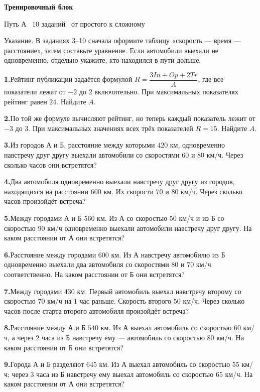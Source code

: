 \documentclass[a4paper,12pt]{article}
\newcommand{\key}[1]{\textcolor{darkaccent}{#1}}
\newcommand{\task}[2]{\par\smallskip\noindent\textbf{#1.}\quad #2\par}
\begin{document}
\clearpage
\begin{center}
{\Large\color{darkaccent}\bfseries Тренировочный блок}\par
{\small Путь А \textbullet\ 10 заданий \textbullet\ от простого к сложному}\par
\end{center}
\vspace{2mm}
\begingroup{}\setlength{\parskip}{1pt}
\noindent\key{Указание.} В заданиях 3--10 сначала оформите таблицу «скорость --- время --- расстояние», затем составьте уравнение. Если автомобили выехали не одновременно, отдельно укажите, кто находился в пути дольше.

\task{1}{Рейтинг публикации задаётся формулой
$R=\dfrac{3In+Op+2Tr}{A}$, где все показатели лежат от $-2$ до $2$ включительно. При максимальных показателях рейтинг равен $24$. Найдите $A$.}

\task{2}{По той же формуле вычисляют рейтинг, но теперь каждый показатель лежит от $-3$ до $3$. При максимальных значениях всех трёх показателей $R=15$. Найдите $A$.}

\task{3}{Из городов А и Б, расстояние между которыми $420$ км, одновременно навстречу друг другу выехали автомобили со скоростями $60$ и $80$ км/ч. Через сколько часов они встретятся?}

\task{4}{Два автомобиля одновременно выехали навстречу друг другу из городов, находящихся на расстоянии $600$ км. Их скорости $70$ и $80$ км/ч. Через сколько часов произойдёт встреча?}

\task{5}{Между городами А и Б $560$ км. Из А со скоростью $50$ км/ч и из Б со скоростью $90$ км/ч одновременно выехали автомобили навстречу друг другу. На каком расстоянии от А они встретятся?}

\task{6}{Расстояние между городами $600$ км. Из А навстречу автомобилю из Б одновременно выехали два автомобиля со скоростями $80$ и $70$ км/ч соответственно. На каком расстоянии от Б они встретятся?}

\task{7}{Между городами $430$ км. Первый автомобиль выехал навстречу второму со скоростью $70$ км/ч на $1$ час раньше. Скорость второго $50$ км/ч. Через сколько часов после старта второго автомобиля произойдёт встреча?}

\task{8}{Расстояние между А и Б $540$ км. Из А выехал автомобиль со скоростью $60$ км/ч, а через $2$ часа из Б навстречу ему --- автомобиль со скоростью $80$ км/ч. На каком расстоянии от Б они встретятся?}

\task{9}{Города А и Б разделяют $645$ км. Из А выехал автомобиль со скоростью $55$ км/ч; через $3$ часа из Б навстречу ему выехал автомобиль со скоростью $65$ км/ч. На каком расстоянии от А они встретятся?}
\end{document}
